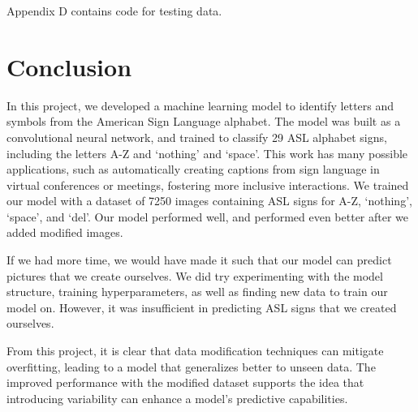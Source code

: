 \documentclass[10pt,twocolumn,letterpaper]{article}
\begin{document}
Appendix D contains code for testing data. 



\section{Conclusion}
In this project, we developed a machine learning model to identify letters and 
symbols from the American Sign Language alphabet. The model was built as a 
convolutional neural network, and trained to classify 29 ASL alphabet signs, 
including the letters A-Z and ‘nothing’ and ‘space’. This work has many possible
applications, such as automatically creating captions from sign language in 
virtual conferences or meetings, fostering more inclusive interactions. 
We trained our model with a dataset of 7250 images containing ASL signs for
A-Z, ‘nothing’, ‘space’, and ‘del’. Our model performed well, and performed
even better after we added modified images.  

If we had more time, we would have made it such that our model can predict pictures 
that we create ourselves. We did try experimenting with the model structure, 
training hyperparameters, as well as finding new data to train our model on. 
However, it was insufficient in predicting ASL signs that we created ourselves.

From this project, it is clear that data modification techniques can mitigate 
overfitting, leading to a model that generalizes better to unseen data. The 
improved performance with the modified dataset supports the idea that introducing
variability can enhance a model's predictive capabilities.




\end{document}
